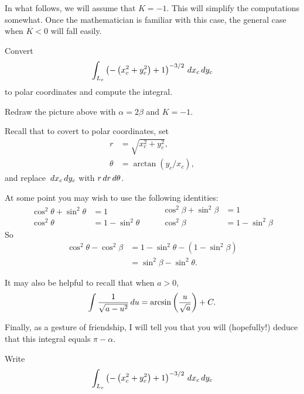 \documentclass[handout,newpage,nooutcomes,hints]{ximera}
\begin{document}
In what follows, we will assume that $K=-1$. This will simplify the
computations somewhat. Once the mathematician is familiar with this
case, the general case when $K<0$ will fall easily.


\begin{problem}
  Convert
  \[
  \int_{L_c} \left(-\left(x_c^2+y_c^2\right)+1\right)^{-3/2} \,d x_c\,d y_c
  \]
  to polar coordinates and compute the integral.
  \begin{hint}
    Redraw the picture above with $\alpha = 2\beta$ and $K=-1$.
  \end{hint}
  \begin{hint}
    Recall that to covert to polar coordinates, set
    \begin{align*}
      r &= \sqrt{x_c^2+y_c^2},\\
      \theta &= \arctan(y_c/x_c),
    \end{align*}
    and replace $\,d x_c\,d y_c$ with $r\,d r\,d \theta$.
  \end{hint}
  \begin{hint}
    At some point you may wish to use the following identities:
    \[
    \begin{split}
      \cos^2\theta + \sin^2\theta &=1\\
      \cos^2\theta &= 1-\sin^2\theta
    \end{split}
    \qquad
    \begin{split}
      \cos^2\beta + \sin^2\beta &=1\\
      \cos^2\beta &= 1-\sin^2\beta
    \end{split}
    \]
    So
    \begin{align*}
      \cos^2\theta - \cos^2\beta &= 1 - \sin^2\theta - \left(1-\sin^2\beta\right)\\
      &= \sin^2\beta - \sin^2\theta.       
    \end{align*}
  \end{hint}
  \begin{hint}
    It may also be helpful to recall that when $a>0$,
    \[
    \int \frac{1}{\sqrt{a - u^2}} \,d u = \arcsin\left(\frac{u}{\sqrt{a}}\right) + C.
    \]
  \end{hint}
  \begin{hint}
    Finally, as a gesture of friendship, I will tell you that you will
    (hopefully!) deduce that this integral equals $\pi-\alpha$.
  \end{hint}
  \begin{freeResponse}
    Write
    \[
    \int_{L_c} \left(-\left(x_c^2+y_c^2\right)+1\right)^{-3/2} \,d x_c\,d y_c
\]
\end{freeResponse}
\end{problem}
\end{document}
